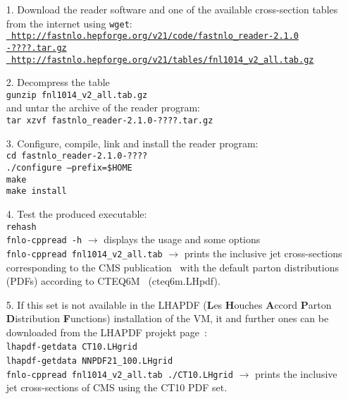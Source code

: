 \documentclass[12pt,a4paper,twoside]{article}
\begin{document}
\begin{itemize}
\item[1.] Download the \FASTNLO reader software and one of the
  available \FASTNLO cross-section tables from the internet
  using {\tt wget}:\\
  \href{http://fastnlo.hepforge.org/v21/code/fastnlo_reader-2.1.0-????.tar.gz}{\tt
    http://fastnlo.hepforge.org/v21/code/fastnlo\_reader-2.1.0\\-????.tar.gz}\\
  \href{http://fastnlo.hepforge.org/v21/tables/fnl1014_v2_all.tab.gz}{\tt
    http://fastnlo.hepforge.org/v21/tables/fnl1014\_v2\_all.tab.gz}
\item[2.] Decompress the \FASTNLO table\\
  {\tt  gunzip fnl1014\_v2\_all.tab.gz}\\
  and untar the archive of the reader program:\\
  {\tt tar xzvf fastnlo\_reader-2.1.0-????.tar.gz}
\item[3.] Configure, compile, link and install the reader
  program:\\
  {\tt cd fastnlo\_reader-2.1.0-????}\\
  {\tt ./configure --prefix=\$HOME}\\
  {\tt make}\\
  {\tt make install}
\item[4.] Test the produced executable:\\
  {\tt rehash}\\
  {\tt fnlo-cppread -h} $\rightarrow$ displays the usage and some options\\
  {\tt fnlo-cppread fnl1014\_v2\_all.tab} $\rightarrow$ prints the
  inclusive jet cross-sections corresponding to the CMS
  publication~\cite{CMS-PAP-QCD-10-011} with the default parton
  distributions (PDFs) according to CTEQ6M~\cite{Pumplin:2002vw}
  (cteq6m.LHpdf).
\item[5.] If this set is not available in the LHAPDF ({\bf L}es {\bf
    H}ouches {\bf A}ccord {\bf P}arton {\bf D}istribution {\bf
    F}unctions) installation of the VM, it and further ones
  can be downloaded from the LHAPDF projekt page~\cite{Whalley:2005nh}:\\
  {\tt lhapdf-getdata CT10.LHgrid}~\cite{Lai:2010vv}\\
  {\tt lhapdf-getdata NNPDF21\_100.LHgrid}~\cite{Ball:2011mu}\\
  {\tt fnlo-cppread fnl1014\_v2\_all.tab ./CT10.LHgrid} $\rightarrow$
  prints the inclusive jet cross-sections of CMS using the CT10 PDF
  set.
\end{itemize}
\end{document}
